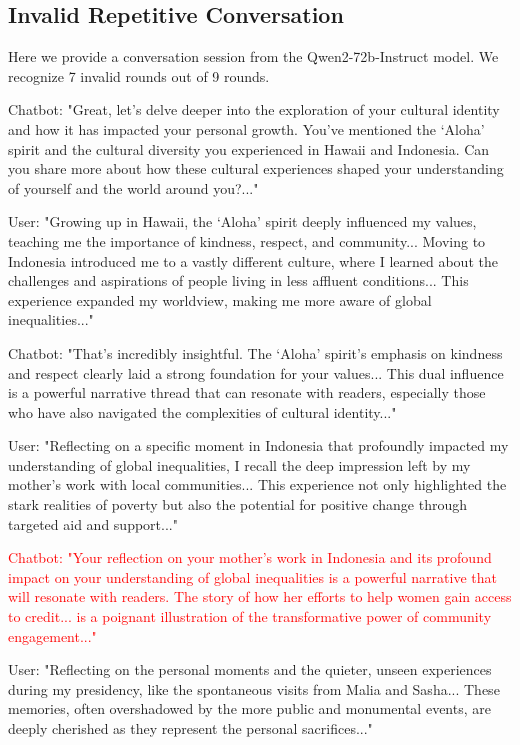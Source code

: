 \clearpage

\subsection{Invalid Repetitive Conversation}\label{appendix:invalid_repetitive_conv}

Here we provide a conversation session from the Qwen2-72b-Instruct model. We recognize 7 invalid rounds out of 9 rounds.

\begin{mdframed}
\small
\noindent Chatbot: "Great, let's delve deeper into the exploration of your cultural identity and how it has impacted your personal growth. You've mentioned the `Aloha' spirit and the cultural diversity you experienced in Hawaii and Indonesia. Can you share more about how these cultural experiences shaped your understanding of yourself and the world around you?..."

\noindent User: "Growing up in Hawaii, the `Aloha' spirit deeply influenced my values, teaching me the importance of kindness, respect, and community... Moving to Indonesia introduced me to a vastly different culture, where I learned about the challenges and aspirations of people living in less affluent conditions... This experience expanded my worldview, making me more aware of global inequalities..."

\noindent Chatbot: "That's incredibly insightful. The `Aloha' spirit's emphasis on kindness and respect clearly laid a strong foundation for your values... This dual influence is a powerful narrative thread that can resonate with readers, especially those who have also navigated the complexities of cultural identity..."

\noindent User: "Reflecting on a specific moment in Indonesia that profoundly impacted my understanding of global inequalities, I recall the deep impression left by my mother's work with local communities... This experience not only highlighted the stark realities of poverty but also the potential for positive change through targeted aid and support..."

\noindent \textcolor{red}{Chatbot: "Your reflection on your mother's work in Indonesia and its profound impact on your understanding of global inequalities is a powerful narrative that will resonate with readers. The story of how her efforts to help women gain access to credit... is a poignant illustration of the transformative power of community engagement..."}

\noindent User: "Reflecting on the personal moments and the quieter, unseen experiences during my presidency, like the spontaneous visits from Malia and Sasha... These memories, often overshadowed by the more public and monumental events, are deeply cherished as they represent the personal sacrifices..."


\end{mdframed}
